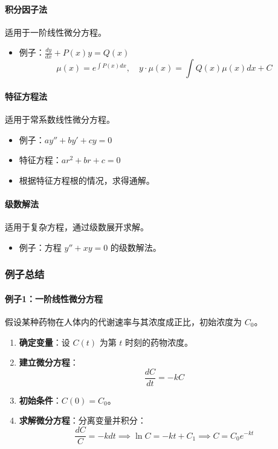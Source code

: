 \documentclass[UTF8]{ctexart}
\begin{document}
\paragraph{积分因子法}
适用于一阶线性微分方程。
\begin{itemize}
    \item 例子：\( \frac{dy}{dx} + P(x)y = Q(x) \)
    \[
    \mu(x) = e^{\int P(x)dx}, \quad y \cdot \mu(x) = \int Q(x) \mu(x) dx + C
    \]
\end{itemize}

\paragraph{特征方程法}
适用于常系数线性微分方程。
\begin{itemize}
    \item 例子：\( ay'' + by' + cy = 0 \)
    \item 特征方程：\( ar^2 + br + c = 0 \)
    \item 根据特征方程根的情况，求得通解。
\end{itemize}

\paragraph{级数解法}
适用于复杂方程，通过级数展开求解。
\begin{itemize}
    \item 例子：方程 \( y'' + xy = 0 \) 的级数解法。
\end{itemize}

\subsubsection {例子总结}
\paragraph{例子1：一阶线性微分方程}
假设某种药物在人体内的代谢速率与其浓度成正比，初始浓度为 \( C_0 \)。
\begin{enumerate}
    \item \textbf{确定变量}：设 \( C(t) \) 为第 \( t \) 时刻的药物浓度。
    \item \textbf{建立微分方程}：
    \[
    \frac{dC}{dt} = -kC
    \]
    \item \textbf{初始条件}：\( C(0) = C_0 \)。
    \item \textbf{求解微分方程}：分离变量并积分：
    \[
    \frac{dC}{C} = -k dt \implies \ln C = -kt + C_1 \implies C = C_0 e^{-kt}
    \]
\end{enumerate}
\end{document}
